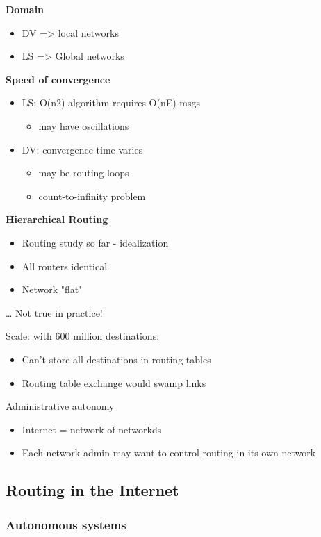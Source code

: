 \documentclass[11pt]{article}
\begin{document}
\textbf{Domain}
\begin{itemize}
\item DV => local networks
\item LS => Global networks
\end{itemize}

\textbf{Speed of convergence}
\begin{itemize}
\item LS: O(n2) algorithm requires O(nE) msgs
\begin{itemize}
\item may have oscillations
\end{itemize}
\item DV: convergence time varies
\begin{itemize}
\item may be routing loops
\item count-to-infinity problem
\end{itemize}
\end{itemize}

\textbf{Hierarchical Routing}
\begin{itemize}
\item Routing study so far - idealization
\item All routers identical
\item Network "flat"
\end{itemize}
\ldots{} Not true in practice!

Scale: with 600 million destinations:
\begin{itemize}
\item Can't store all destinations in routing tables
\item Routing table exchange would swamp links
\end{itemize}

Administrative autonomy
\begin{itemize}
\item Internet = network of networkds
\item Each network admin may want to control routing in its own network
\end{itemize}


\subsection{Routing in the Internet}
\label{sec:orgebeda86}

\subsubsection{Autonomous systems}
\label{sec:orgd5fa9e8}
\end{document}
